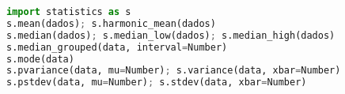 \begin{lstlisting}[language=python, otherkeywords={as}]
import statistics as s
s.mean(dados); s.harmonic_mean(dados)
s.median(dados); s.median_low(dados); s.median_high(dados)
s.median_grouped(data, interval=Number)
s.mode(data)
s.pvariance(data, mu=Number); s.variance(data, xbar=Number)
s.pstdev(data, mu=Number); s.stdev(data, xbar=Number)
\end{lstlisting}